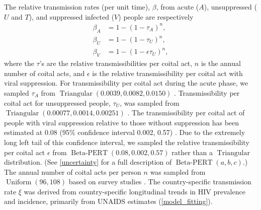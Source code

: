 \documentclass{article}
\DeclareMathOperator{\Uniform}{Uniform}
\DeclareMathOperator{\Triangular}{Triangular}
\DeclareMathOperator{\BetaPERT}{Beta-PERT}
\begin{document}
The relative transmission rates (per unit time), $\beta$, from acute
($A$), unsuppressed ($U$ and $T$), and suppressed infected ($V$)
people are respectively
\begin{equation}
  \label{betas}
  \begin{split}
    \beta_A &= 1 - (1 - \tau_A)^n,
    \\
    \beta_U &= 1 - (1 - \tau_U)^n,
    \\
    \beta_V &= 1 - (1 - \epsilon \tau_U)^n,
  \end{split}
\end{equation}
where the $\tau$'s are the relative transmissibilities per coital act,
$n$ is the annual number of coital acts, and $\epsilon$ is the
relative transmissibility per coital act with viral suppression.  For
transmissibility per coital act during the acute phase, we sampled
$\tau_A$ from
$\Triangular(0.0039, 0.0082,
0.0150)$ \cite{Wawer2005-us,
  Skarbinski2015-ni}.
Transmissibility per coital act for unsuppressed people, $\tau_U$, was
sampled from
$\Triangular(0.00077, 0.0014, 0.00251)$ \cite{Hughes2012-so}.  The
transmissibility per coital act of people with viral suppression
relative to those without suppression has been estimated at 0.08 (95\%
confidence interval 0.002, 0.57) \cite{Donnell2010-xo}.  Due to the
extremely long left tail of this confidence interval, we sampled the
relative transmissibility per coital act $\epsilon$ from
$\BetaPERT(0.08, 0.002, 0.57)$ rather than a $\Triangular$
distribution.  (See \autoref{uncertainty} for a full description of
$\BetaPERT(a, b, c)$.)  The annual number of coital acts per person
$n$ was sampled from $\Uniform(96, 108)$ based on survey
studies \cite{Wawer2005-us, Abdool_Karim2010-cm}.  The country-specific
transmission rate $\xi$ was derived from country-specific longitudinal
trends in HIV prevalence and incidence, primarily from UNAIDS
estimates (\autoref{model_fitting}).
\end{document}
